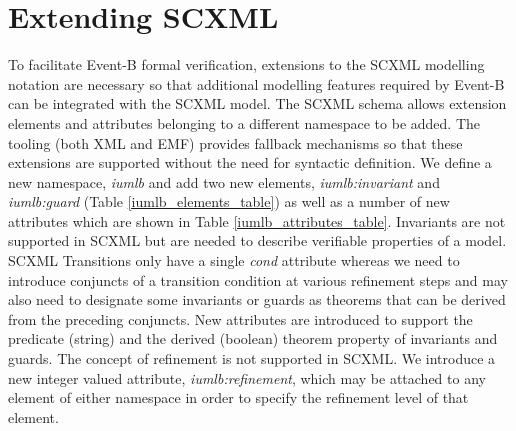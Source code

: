 
\section{Extending SCXML}
\label{sect:extension}


To facilitate Event-B formal verification, extensions to the SCXML modelling notation are necessary so that additional modelling features required by Event-B can be integrated with the SCXML model.
The SCXML schema allows extension elements and attributes belonging to a different namespace to be added. The tooling (both XML and EMF) provides fallback mechanisms so that these extensions are supported without the need for syntactic definition. We define a new namespace,  \emph{iumlb} and add two new elements, \emph{iumlb:invariant} and \emph{iumlb:guard} (Table \ref{iumlb_elements_table}) as well as a number of new attributes which are shown in Table \ref{iumlb_attributes_table}.
 Invariants are not supported in SCXML but are needed to describe verifiable properties of a model. SCXML Transitions only have a single \emph{cond} attribute whereas we need to introduce conjuncts of a transition condition at various refinement steps and may also need to designate some invariants or guards as theorems that can be derived from the preceding conjuncts. 
New attributes are introduced to support the predicate (string) and the derived (boolean) theorem property of invariants and guards. The concept of refinement is not supported in SCXML. We introduce a new integer valued attribute, \emph{iumlb:refinement}, which may be attached to any element of either namespace in order to specify the refinement level of that element. 



